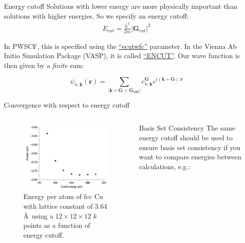 \documentclass[aspectratio=169]{beamer}
\let \vec \mathbf
\begin{document}
    \begin{frame}{Energy cutoff}
        Solutions with lower energy are more physically important than solutions with higher energies. So we specify an energy cutoff:
        \begin{eqnarray*}
            E_{cut} = \frac{\bar{h}^2}{2m}|\vec{G}_{cut}|^2
        \end{eqnarray*}

        In PWSCF, this is specified using the \href{https://www.quantum-espresso.org/Doc/INPUT_PW.html}{``ecutwfc''} parameter. In the Vienna Ab Initio Simulation Package (VASP), it is called \href{https://www.vasp.at/wiki/index.php/ENCUT}{``ENCUT''}.\newline
        \newline
        Our wave function is then given by a \textit{finite} sum:

        \begin{equation*}
            \psi_{n,\vec{k}}(\vec{r}) = \sum_{|\vec{k}+\vec{G}<\vec{G_{cut}}|} c^{\vec{G}}_{n,\vec{k}} e^{i(\vec{k}+\vec{G}).\vec{r}}
        \end{equation*}

    \end{frame}

    \begin{frame}{Convergence with respect to energy cutoff}
        \begin{columns}
            \begin{figure}
                \centering
                \includegraphics[width=0.8\linewidth]{lectures/figures/7_convergence_energy_cutoff.png}
                \caption{Energy per atom of fcc Cu with lattice constant of 3.64 \AA~using a $12 \times 12 \times 12$ $k$ points as a function of energy cutoff.\cite{shollDensityFunctionalTheory2009}}
            \end{figure}
            \begin{alertblock}{Basis Set Consistency}
                The same energy cutoff should be used to ensure basis set consistency if you want to compare energies between calculations, e.g.:

            \end{alertblock}
        \end{columns}

    \end{frame}
\end{document}
